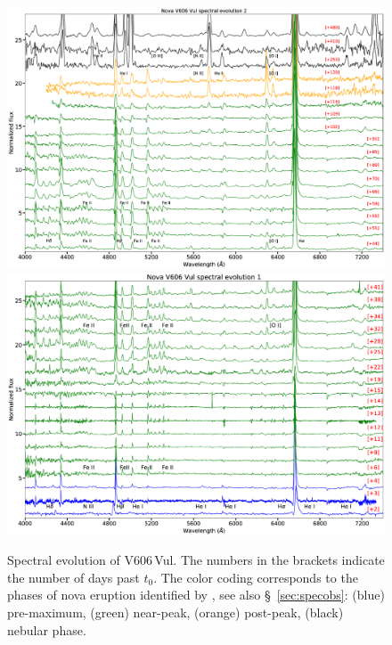 \documentclass[twocolumn]{aastex631}
\newcommand{\nova}{V606\,Vul}
\begin{document}
\begin{figure}
        \includegraphics[width=0.9\linewidth,clip=true,trim=0.0cm 0cm 0cm 1.40cm,angle=0]{V606_Vul_spec_2_lowresplaceholder2.eps}\\
        \includegraphics[width=0.9\linewidth,clip=true,trim=0.0cm 0cm 0cm 1.60cm,angle=0]{V606_Vul_spec_1_lowresplaceholder2.eps}\\
\caption{Spectral evolution of \nova{}. The numbers in the brackets indicate the number of days past $t_0$.
The color coding corresponds to the phases of nova eruption identified by \cite{2023arXiv230907097A}, see also \S~\ref{sec:specobs}: (blue) pre-maximum, (green) near-peak, (orange) post-peak, (black) nebular phase.
}
    \label{fig:spectralevolution}
\end{figure}
\end{document}
